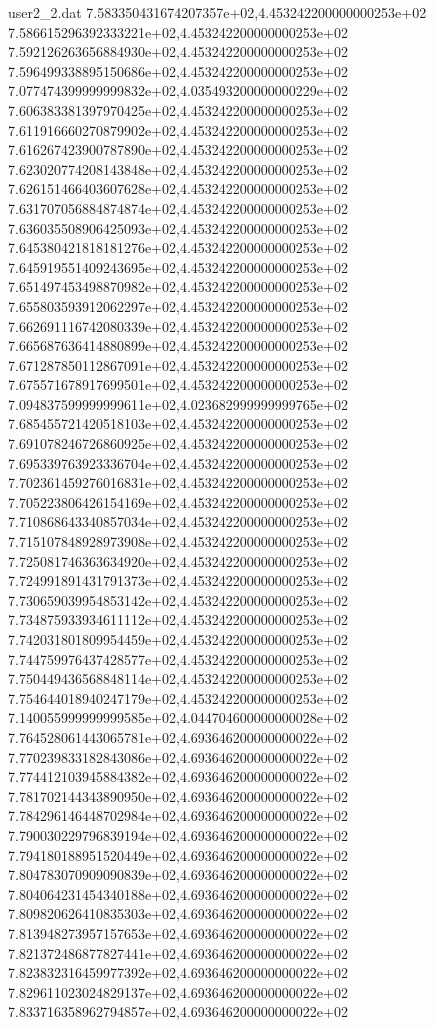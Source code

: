\begin{filecontents}{user2_2.dat}
7.583350431674207357e+02,4.453242200000000253e+02
7.586615296392333221e+02,4.453242200000000253e+02
7.592126263656884930e+02,4.453242200000000253e+02
7.596499338895150686e+02,4.453242200000000253e+02
7.077474399999999832e+02,4.035493200000000229e+02
7.606383381397970425e+02,4.453242200000000253e+02
7.611916660270879902e+02,4.453242200000000253e+02
7.616267423900787890e+02,4.453242200000000253e+02
7.623020774208143848e+02,4.453242200000000253e+02
7.626151466403607628e+02,4.453242200000000253e+02
7.631707056884874874e+02,4.453242200000000253e+02
7.636035508906425093e+02,4.453242200000000253e+02
7.645380421818181276e+02,4.453242200000000253e+02
7.645919551409243695e+02,4.453242200000000253e+02
7.651497453498870982e+02,4.453242200000000253e+02
7.655803593912062297e+02,4.453242200000000253e+02
7.662691116742080339e+02,4.453242200000000253e+02
7.665687636414880899e+02,4.453242200000000253e+02
7.671287850112867091e+02,4.453242200000000253e+02
7.675571678917699501e+02,4.453242200000000253e+02
7.094837599999999611e+02,4.023682999999999765e+02
7.685455721420518103e+02,4.453242200000000253e+02
7.691078246726860925e+02,4.453242200000000253e+02
7.695339763923336704e+02,4.453242200000000253e+02
7.702361459276016831e+02,4.453242200000000253e+02
7.705223806426154169e+02,4.453242200000000253e+02
7.710868643340857034e+02,4.453242200000000253e+02
7.715107848928973908e+02,4.453242200000000253e+02
7.725081746363634920e+02,4.453242200000000253e+02
7.724991891431791373e+02,4.453242200000000253e+02
7.730659039954853142e+02,4.453242200000000253e+02
7.734875933934611112e+02,4.453242200000000253e+02
7.742031801809954459e+02,4.453242200000000253e+02
7.744759976437428577e+02,4.453242200000000253e+02
7.750449436568848114e+02,4.453242200000000253e+02
7.754644018940247179e+02,4.453242200000000253e+02
7.140055999999999585e+02,4.044704600000000028e+02
7.764528061443065781e+02,4.693646200000000022e+02
7.770239833182843086e+02,4.693646200000000022e+02
7.774412103945884382e+02,4.693646200000000022e+02
7.781702144343890950e+02,4.693646200000000022e+02
7.784296146448702984e+02,4.693646200000000022e+02
7.790030229796839194e+02,4.693646200000000022e+02
7.794180188951520449e+02,4.693646200000000022e+02
7.804783070909090839e+02,4.693646200000000022e+02
7.804064231454340188e+02,4.693646200000000022e+02
7.809820626410835303e+02,4.693646200000000022e+02
7.813948273957157653e+02,4.693646200000000022e+02
7.821372486877827441e+02,4.693646200000000022e+02
7.823832316459977392e+02,4.693646200000000022e+02
7.829611023024829137e+02,4.693646200000000022e+02
7.833716358962794857e+02,4.693646200000000022e+02

\end{filecontents}

